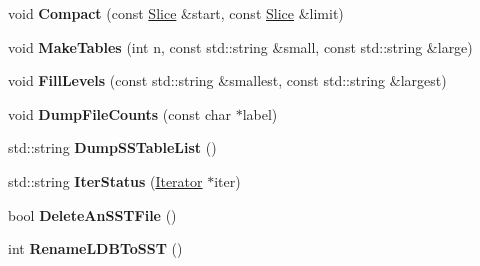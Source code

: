 \begin{DoxyCompactItemize}
\item 
\mbox{\label{classleveldb_1_1_d_b_test_a9b6cd10fd7c8fc54127b0c40c0ac7db5}} 
void {\bfseries Compact} (const \mbox{\hyperlink{classleveldb_1_1_slice}{Slice}} \&start, const \mbox{\hyperlink{classleveldb_1_1_slice}{Slice}} \&limit)
\item 
\mbox{\label{classleveldb_1_1_d_b_test_ace931478fa5ad2c48a8aa95a344e19fd}} 
void {\bfseries Make\+Tables} (int n, const std\+::string \&small, const std\+::string \&large)
\item 
\mbox{\label{classleveldb_1_1_d_b_test_ac291d06db907f5fee7caf04f44f65493}} 
void {\bfseries Fill\+Levels} (const std\+::string \&smallest, const std\+::string \&largest)
\item 
\mbox{\label{classleveldb_1_1_d_b_test_ad045c5203b4ea785ab335ffc3ea833b3}} 
void {\bfseries Dump\+File\+Counts} (const char $\ast$label)
\item 
\mbox{\label{classleveldb_1_1_d_b_test_afdfc077be555dea7eac220623f6d4deb}} 
std\+::string {\bfseries Dump\+S\+S\+Table\+List} ()
\item 
\mbox{\label{classleveldb_1_1_d_b_test_ad162fa0f5a31e61ee94ba9f45af716f8}} 
std\+::string {\bfseries Iter\+Status} (\mbox{\hyperlink{classleveldb_1_1_iterator}{Iterator}} $\ast$iter)
\item 
\mbox{\label{classleveldb_1_1_d_b_test_abcb2ebeb0733670d7634079c587426d2}} 
bool {\bfseries Delete\+An\+S\+S\+T\+File} ()
\item 
\mbox{\label{classleveldb_1_1_d_b_test_a104ae4b9292787d0cfc9a9fb93cc5fa8}} 
int {\bfseries Rename\+L\+D\+B\+To\+S\+ST} ()
\end{DoxyCompactItemize}

